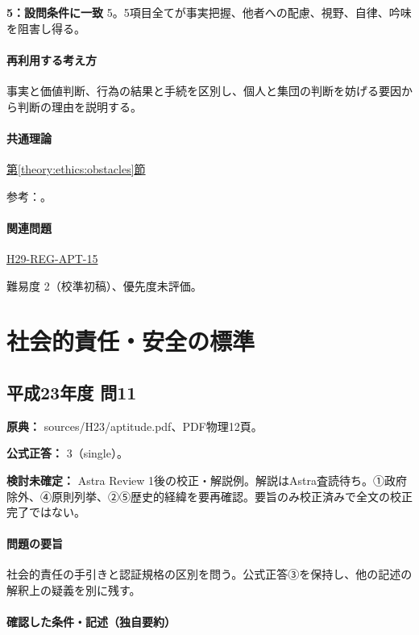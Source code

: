 \noindent\textbf{5：設問条件に一致} 5。5項目全てが事実把握、他者への配慮、視野、自律、吟味を阻害し得る。\par

\paragraph{再利用する考え方} 事実と価値判断、行為の結果と手続を区別し、個人と集団の判断を妨げる要因から判断の理由を説明する。

\paragraph{共通理論} \hyperref[theory:ethics:obstacles]{第\ref*{theory:ethics:obstacles}節}

\par 参考：\cite{davis_seven_steps}。

\paragraph{関連問題} \hyperref[q:h29-reg-apt-15]{H29-REG-APT-15}

\par 難易度 2（校準初稿）、優先度未評価。

\section{社会的責任・安全の標準}

\subsection{平成23年度 問11}
\label{q:h23-reg-apt-11}

\noindent\textbf{原典：} sources/H23/aptitude.pdf、PDF物理12頁。

\textbf{公式正答：} 3（single）。

\par\textbf{検討未確定：} Astra Review 1後の校正・解説例。解説はAstra査読待ち。①政府除外、④原則列挙、②⑤歴史的経緯を要再確認。要旨のみ校正済みで全文の校正完了ではない。

\paragraph{問題の要旨} 社会的責任の手引きと認証規格の区別を問う。公式正答③を保持し、他の記述の解釈上の疑義を別に残す。

\paragraph{確認した条件・記述（独自要約）}\mbox{}\par

